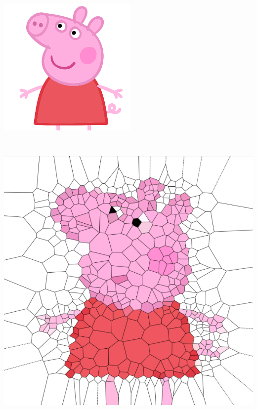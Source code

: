 \documentclass[a1,portrait]{a0poster}
\begin{document}
\begin{multicols}{2}
\begin{center}
	\begin{minipage}{.4\linewidth}
		\centering
		\includegraphics[width=.95\linewidth]{col/peppa.png}
		\label{fig:source}
	\end{minipage}%
	~
	\begin{minipage}{.4\linewidth}
		\centering
		\includegraphics[width=.95\linewidth]{proc/peppa_500.png}
		\label{fig:fuzzy}
	\end{minipage}
\end{center}



\end{multicols}
\end{document}
